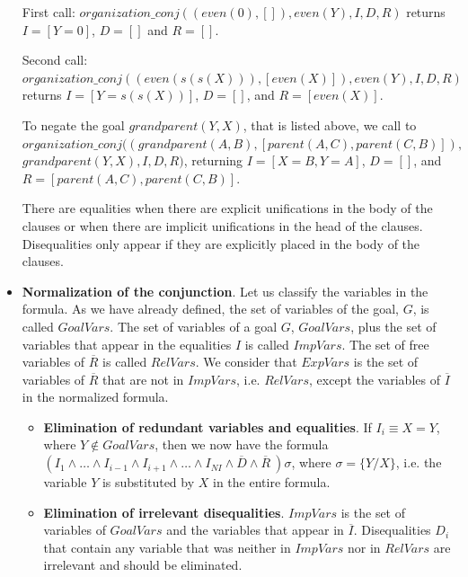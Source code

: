 \documentclass{tlp}
\begin{document}
\begin{itemize}
{First call: $organization\_conj((even(0),[]),even(Y),I,D,R)$ returns $I=[Y=0]$,
$D=[]$ and $R=[]$.

Second call: $organization\_conj((even(s(s(X))),[even(X)]),even(Y),I,D,R)$
returns $I=[Y=s(s(X))]$, $D=[]$, and $R=[even(X)]$.

To negate the goal $grandparent(Y,X)$, that is listed above, we call to \\
$organization\_conj((grandparent(A,B),[parent(A,C),parent(C,B)]),$ \\
$grandparent(Y,X),I,D,R)$,
returning $I=[X=B,Y=A]$, $D=[]$, and $R=[parent(A,C),parent(C,B)]$.

There are equalities when there are explicit unifications in the body of the
clauses or when there are implicit unifications in the head of the
clauses. Disequalities only appear if they are explicitly placed in the body of the
clauses.
}


\item {\bf Normalization of the conjunction}. Let us classify the variables in
the formula. As we have already defined, the set of variables of the goal, $G$, is called $GoalVars$. The set of variables of a goal $G$, $GoalVars$, plus the set of variables that appear in the equalities $I$ is called $ImpVars$. The
set of free variables of $\overline{R}$ is called $RelVars$. We consider that
$ExpVars$ is the set of variables of $\overline{R}$ that are not in $ImpVars$,
i.e. $RelVars$, except the variables of $\overline{I}$ in the normalized
formula.

    \begin{itemize}

       \item {\bf Elimination of redundant variables and equalities}. If $I_i
       \equiv X = Y$, where $Y \not\in GoalVars$, then we now have the formula
       $ ( I_1 \wedge \ldots \wedge I_{i-1} \wedge I_{i+1} \wedge \ldots
       \wedge I_{NI} \wedge \overline{D} \wedge \overline{R}~) \sigma $, where
       $ \sigma = \{ Y / X \}$, i.e. the variable $Y$ is substituted by $X$ in
       the entire formula.
       \item {\bf Elimination of irrelevant disequalities}. $ImpVars$
       is the set of variables of $GoalVars$ and the variables that
       appear in $\overline{I}$. Disequalities $D_i$ that contain
       any variable that was neither in $ImpVars$ nor in $RelVars$ are
       irrelevant and should be eliminated.


\end{itemize}
\end{itemize}
\end{document}

